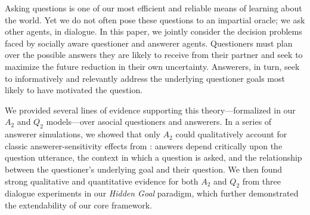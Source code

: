 \documentclass[11pt, floatsintext]{apa6}
\begin{document}
Asking questions is one of our most efficient and reliable means of learning about the world. 
Yet we do not often pose these questions to an impartial oracle; we ask other agents, in dialogue. In this paper, we jointly consider the decision problems faced by socially aware questioner and answerer agents. 
Questioners must plan over the possible answers they are likely to receive from their partner and seek to maximize the future reduction in their own uncertainty. 
Answerers, in turn, seek to informatively and relevantly address the underlying questioner goals most likely to have motivated the question. 

We provided several lines of evidence supporting this theory---formalized in our $A_2$ and $Q_2$ models---over asocial questioners and answerers. 
In a series of answerer simulations, we showed that only $A_2$ could qualitatively account for classic answerer-sensitivity effects from : answers depend critically upon the question utterance, the context in which a question is asked, and the relationship between the questioner's underlying goal and their question. 
We then found strong qualitative and quantitative evidence for both $A_2$ and $Q_2$ from three dialogue experiments in our \emph{Hidden Goal} paradigm, which further demonstrated the extendability of our core framework. %

\end{document}

